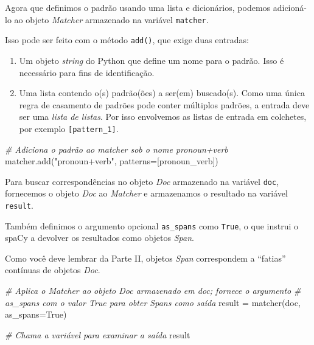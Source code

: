 \documentclass[
  brazilian,
]{article}
\newenvironment{Shaded}{}{}
\newcommand{\CommentTok}[1]{\textcolor[rgb]{0.38,0.63,0.69}{\textit{#1}}}
\newcommand{\NormalTok}[1]{#1}
\newcommand{\OperatorTok}[1]{\textcolor[rgb]{0.40,0.40,0.40}{#1}}
\newcommand{\StringTok}[1]{\textcolor[rgb]{0.25,0.44,0.63}{#1}}
\newcommand{\VariableTok}[1]{\textcolor[rgb]{0.10,0.09,0.49}{#1}}
\providecommand{\tightlist}{%
  \setlength{\itemsep}{0pt}\setlength{\parskip}{0pt}}
\begin{document}
Agora que definimos o padrão usando uma lista e dicionários, podemos
adicioná-lo ao objeto \emph{Matcher} armazenado na variável
\texttt{matcher}.

Isso pode ser feito com o método \texttt{add()}, que exige duas
entradas:

\begin{enumerate}
\def\labelenumi{\arabic{enumi}.}
\tightlist
\item
  Um objeto \emph{string} do Python que define um nome para o padrão.
  Isso é necessário para fins de identificação.
\item
  Uma lista contendo o(s) padrão(ões) a ser(em) buscado(s). Como uma
  única regra de casamento de padrões pode conter múltiplos padrões, a
  entrada deve ser uma \emph{lista de listas}. Por isso envolvemos as
  listas de entrada em colchetes, por exemplo \texttt{{[}pattern\_1{]}}.
\end{enumerate}

\begin{Shaded}
\begin{Highlighting}[]
\CommentTok{\# Adiciona o padrão ao matcher sob o nome \textquotesingle{}pronoun+verb\textquotesingle{}}
\NormalTok{matcher.add(}\StringTok{"pronoun+verb"}\NormalTok{, patterns}\OperatorTok{=}\NormalTok{[pronoun\_verb])}
\end{Highlighting}
\end{Shaded}

Para buscar correspondências no objeto \emph{Doc} armazenado na variável
\texttt{doc}, fornecemos o objeto \emph{Doc} ao \emph{Matcher} e
armazenamos o resultado na variável \texttt{result}.

Também definimos o argumento opcional \texttt{as\_spans} como
\texttt{True}, o que instrui o spaCy a devolver os resultados como
objetos \emph{Span}.

Como você deve lembrar da Parte II, objetos \emph{Span} correspondem a
``fatias'' contínuas de objetos \emph{Doc}.

\begin{Shaded}
\begin{Highlighting}[]
\CommentTok{\# Aplica o Matcher ao objeto Doc armazenado em \textquotesingle{}doc\textquotesingle{}; fornece o argumento}
\CommentTok{\# \textquotesingle{}as\_spans\textquotesingle{} com o valor True para obter Spans como saída}
\NormalTok{result }\OperatorTok{=}\NormalTok{ matcher(doc, as\_spans}\OperatorTok{=}\VariableTok{True}\NormalTok{)}

\CommentTok{\# Chama a variável para examinar a saída}
\NormalTok{result}
\end{Highlighting}
\end{Shaded}
\end{document}
